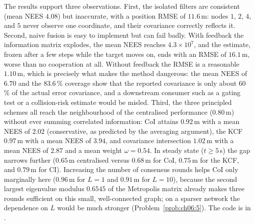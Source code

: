 \begin{example}
The results support three observations. First, the isolated filters are consistent (mean NEES $4.08$) but inaccurate, with a position RMSE of $11.6$\,m: nodes $1$, $2$, $4$, and $5$ never observe one coordinate, and their covariance correctly reflects it. Second, naive fusion is easy to implement but can fail badly. With feedback the information matrix explodes, the mean NEES reaches $4.3\times10^{7}$, and the estimate, frozen after a few steps while the target moves on, ends with an RMSE of $16.1$\,m, worse than no cooperation at all. Without feedback the RMSE is a reasonable $1.10$\,m, which is precisely what makes the method dangerous: the mean NEES of $6.70$ and the $83.6\,\%$ coverage show that the reported covariance is only about 60\,\% of the actual error covariance, and a downstream consumer such as a gating test or a collision-risk estimate would be misled. Third, the three principled schemes all reach the neighbourhood of the centralised performance ($0.80$\,m) without ever summing correlated information: CoI attains $0.92$\,m with a mean NEES of $2.02$ (conservative, as predicted by the averaging argument), the KCF $0.97$\,m with a mean NEES of $3.94$, and covariance intersection $1.02$\,m with a mean NEES of $2.87$ and a mean weight $\omega=0.54$. In steady state ($t\ge5$\,s) the gap narrows further ($0.65$\,m centralised versus $0.68$\,m for CoI, $0.75$\,m for the KCF, and $0.79$\,m for CI). Increasing the number of consensus rounds helps CoI only marginally here ($0.96$\,m for $L=1$ and $0.91$\,m for $L=10$), because the second largest eigenvalue modulus $0.6545$ of the Metropolis matrix already makes three rounds sufficient on this small, well-connected graph; on a sparser network the dependence on $L$ would be much stronger (Problem~\ref{prob:ch06:5}). The code is in .
\end{example}

